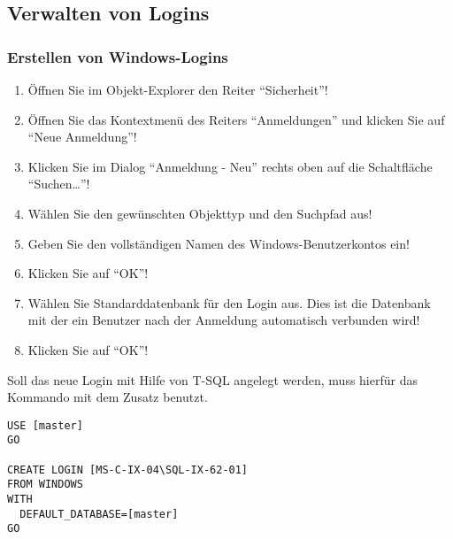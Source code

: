      \subsection{Verwalten von Logins}
        \subsubsection{Erstellen von Windows-Logins}
          \begin{enumerate}
            \item Öffnen Sie im Objekt-Explorer den Reiter \enquote{Sicherheit}!
            \item Öffnen Sie das Kontextmenü des Reiters \enquote{Anmeldungen}
            und klicken Sie auf \enquote{Neue Anmeldung}!
            \item Klicken Sie im Dialog \enquote{Anmeldung - Neu} rechts oben
            auf die Schaltfläche \enquote{Suchen\ldots}!
            \item Wählen Sie den gewünschten Objekttyp und den Suchpfad aus!
            \item Geben Sie den vollständigen Namen des Windows-Benutzerkontos
            ein!
            \item Klicken Sie auf \enquote{OK}!
            \item Wählen Sie Standarddatenbank für den Login aus. Dies ist die
            Datenbank mit der ein Benutzer nach der Anmeldung automatisch
            verbunden wird!
            \item Klicken Sie auf \enquote{OK}!
          \end{enumerate}
          Soll das neue Login mit Hilfe von T-SQL angelegt werden, muss hierfür
          das Kommando  mit dem Zusatz
           benutzt.
          \begin{lstlisting}[language=ms_sql, caption={Anlegen eines
          Windows-Logins mit T-SQL}, label=admin19_06]
USE [master]
GO

CREATE LOGIN [MS-C-IX-04\SQL-IX-62-01] 
FROM WINDOWS 
WITH 
  DEFAULT_DATABASE=[master]
GO        
        \end{lstlisting}
